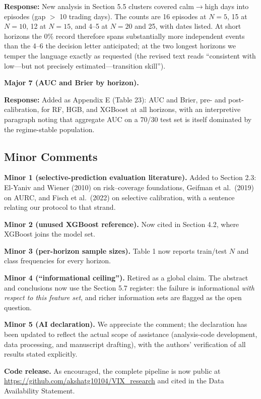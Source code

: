 \documentclass[11pt]{article}
\newcommand{\response}{\textbf{Response:} }
\begin{document}
\response New analysis in Section 5.5 clusters covered calm$\to$high days into episodes
(gap $>$ 10 trading days). The counts are 16 episodes at $N = 5$, 15 at $N = 10$, 12 at
$N = 15$, and 4--5 at $N = 20$ and 25, with dates listed. At short horizons the 0\% record
therefore spans substantially more independent events than the 4--6 the decision letter
anticipated; at the two longest horizons we temper the language exactly as requested (the
revised text reads ``consistent with low---but not precisely estimated---transition skill'').

\textbf{Major 7 (AUC and Brier by horizon).}

\response Added as Appendix E (Table 23): AUC and Brier, pre- and post-calibration, for RF,
HGB, and XGBoost at all horizons, with an interpretive paragraph noting that aggregate AUC on
a 70/30 test set is itself dominated by the regime-stable population.

\subsection*{Minor Comments}

\textbf{Minor 1 (selective-prediction evaluation literature).} Added to Section 2.3: El-Yaniv
and Wiener (2010) on risk--coverage foundations, Geifman et al.\ (2019) on AURC, and Fisch et
al.\ (2022) on selective calibration, with a sentence relating our protocol to that strand.

\textbf{Minor 2 (unused XGBoost reference).} Now cited in Section 4.2, where XGBoost joins the
model set.

\textbf{Minor 3 (per-horizon sample sizes).} Table 1 now reports train/test $N$ and class
frequencies for every horizon.

\textbf{Minor 4 (``informational ceiling'').} Retired as a global claim. The abstract and
conclusions now use the Section 5.7 register: the failure is informational \emph{with respect
to this feature set}, and richer information sets are flagged as the open question.

\textbf{Minor 5 (AI declaration).} We appreciate the comment; the declaration has been updated
to reflect the actual scope of assistance (analysis-code development, data processing, and
manuscript drafting), with the authors' verification of all results stated explicitly.

\textbf{Code release.} As encouraged, the complete pipeline is now public at
\url{https://github.com/akshatg10104/VIX_research} and cited in the Data Availability
Statement.
\end{document}
